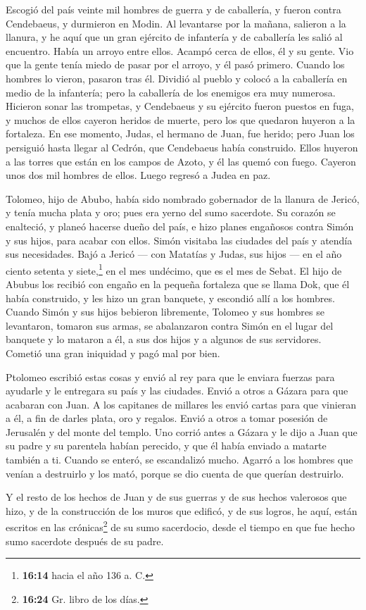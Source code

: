  Escogió del país veinte mil hombres de guerra y de
caballería, y fueron contra Cendebaeus, y durmieron en Modin.
 Al levantarse por la mañana, salieron a la llanura, y he
aquí que un gran ejército de infantería y de caballería les salió al
encuentro. Había un arroyo entre ellos.  Acampó cerca de
ellos, él y su gente. Vio que la gente tenía miedo de pasar por el
arroyo, y él pasó primero. Cuando los hombres lo vieron, pasaron tras
él.  Dividió al pueblo y colocó a la caballería en medio
de la infantería; pero la caballería de los enemigos era muy numerosa.
 Hicieron sonar las trompetas, y Cendebaeus y su ejército
fueron puestos en fuga, y muchos de ellos cayeron heridos de muerte,
pero los que quedaron huyeron a la fortaleza.  En ese
momento, Judas, el hermano de Juan, fue herido; pero Juan los persiguió
hasta llegar al Cedrón, que Cendebaeus había construido. 
Ellos huyeron a las torres que están en los campos de Azoto, y él las
quemó con fuego. Cayeron unos dos mil hombres de ellos. Luego regresó a
Judea en paz.

 Tolomeo, hijo de Abubo, había sido nombrado gobernador
de la llanura de Jericó, y tenía mucha plata y oro;  pues
era yerno del sumo sacerdote.  Su corazón se enalteció, y
planeó hacerse dueño del país, e hizo planes engañosos contra Simón y
sus hijos, para acabar con ellos.  Simón visitaba las
ciudades del país y atendía sus necesidades. Bajó a Jericó --- con
Matatías y Judas, sus hijos --- en el año ciento setenta y
siete,\footnote{\textbf{16:14} hacia el año 136 a. C.} en el mes
undécimo, que es el mes de Sebat.  El hijo de Abubus los
recibió con engaño en la pequeña fortaleza que se llama Dok, que él
había construido, y les hizo un gran banquete, y escondió allí a los
hombres.  Cuando Simón y sus hijos bebieron libremente,
Tolomeo y sus hombres se levantaron, tomaron sus armas, se abalanzaron
contra Simón en el lugar del banquete y lo mataron a él, a sus dos hijos
y a algunos de sus servidores.  Cometió una gran
iniquidad y pagó mal por bien.

 Ptolomeo escribió estas cosas y envió al rey para que le
enviara fuerzas para ayudarle y le entregara su país y las ciudades.
 Envió a otros a Gázara para que acabaran con Juan. A los
capitanes de millares les envió cartas para que vinieran a él, a fin de
darles plata, oro y regalos.  Envió a otros a tomar
posesión de Jerusalén y del monte del templo.  Uno corrió
antes a Gázara y le dijo a Juan que su padre y su parentela habían
perecido, y que él había enviado a matarte también a ti. 
Cuando se enteró, se escandalizó mucho. Agarró a los hombres que venían
a destruirlo y los mató, porque se dio cuenta de que querían destruirlo.

 Y el resto de los hechos de Juan y de sus guerras y de
sus hechos valerosos que hizo, y de la construcción de los muros que
edificó, y de sus logros,  he aquí, están escritos en las
crónicas\footnote{\textbf{16:24} Gr. libro de los días.} de su sumo
sacerdocio, desde el tiempo en que fue hecho sumo sacerdote después de
su padre.
